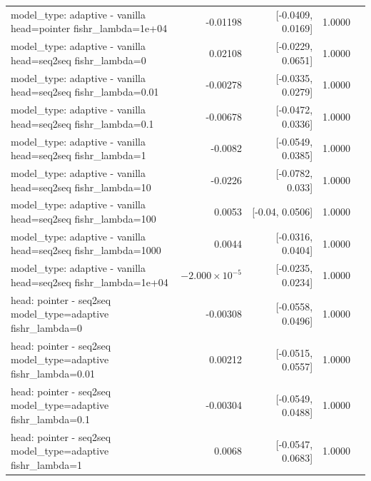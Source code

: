 \documentclass[10pt]{article}
\makeatletter
\newcommand{\stackcell}[1]{\begin{tabular}[t]{@{}l@{}}#1\end{tabular}}
\makeatother
\begin{document}
{\begin{longtable}{lrrrl}
\stackcell{model\_type: adaptive - vanilla\\\footnotesize head=pointer fishr\_lambda=1e+04 } & -0.01198 & [-0.0409, 0.0169] & 1.0000 & \\
\stackcell{model\_type: adaptive - vanilla\\\footnotesize head=seq2seq fishr\_lambda=0 } & 0.02108 & [-0.0229, 0.0651] & 1.0000 & \\
\stackcell{model\_type: adaptive - vanilla\\\footnotesize head=seq2seq fishr\_lambda=0.01 } & -0.00278 & [-0.0335, 0.0279] & 1.0000 & \\
\stackcell{model\_type: adaptive - vanilla\\\footnotesize head=seq2seq fishr\_lambda=0.1 } & -0.00678 & [-0.0472, 0.0336] & 1.0000 & \\
\stackcell{model\_type: adaptive - vanilla\\\footnotesize head=seq2seq fishr\_lambda=1 } & -0.0082 & [-0.0549, 0.0385] & 1.0000 & \\
\stackcell{model\_type: adaptive - vanilla\\\footnotesize head=seq2seq fishr\_lambda=10 } & -0.0226 & [-0.0782, 0.033] & 1.0000 & \\
\stackcell{model\_type: adaptive - vanilla\\\footnotesize head=seq2seq fishr\_lambda=100 } & 0.0053 & [-0.04, 0.0506] & 1.0000 & \\
\stackcell{model\_type: adaptive - vanilla\\\footnotesize head=seq2seq fishr\_lambda=1000 } & 0.0044 & [-0.0316, 0.0404] & 1.0000 & \\
\stackcell{model\_type: adaptive - vanilla\\\footnotesize head=seq2seq fishr\_lambda=1e+04 } & $-2.000\times10^{-5}$ & [-0.0235, 0.0234] & 1.0000 & \\
\stackcell{head: pointer - seq2seq\\\footnotesize model\_type=adaptive fishr\_lambda=0 } & -0.00308 & [-0.0558, 0.0496] & 1.0000 & \\
\stackcell{head: pointer - seq2seq\\\footnotesize model\_type=adaptive fishr\_lambda=0.01 } & 0.00212 & [-0.0515, 0.0557] & 1.0000 & \\
\stackcell{head: pointer - seq2seq\\\footnotesize model\_type=adaptive fishr\_lambda=0.1 } & -0.00304 & [-0.0549, 0.0488] & 1.0000 & \\
\stackcell{head: pointer - seq2seq\\\footnotesize model\_type=adaptive fishr\_lambda=1 } & 0.0068 & [-0.0547, 0.0683] & 1.0000 & \\

\end{longtable}}
\end{document}

